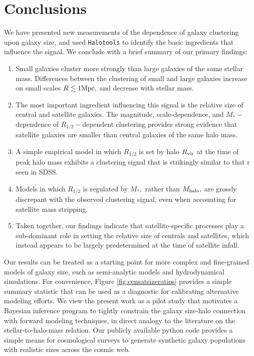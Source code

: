 \documentclass[usenatbib,usegraphicx,letterpaper]{mn2e}
\newcommand{\ben}{\begin{enumerate}}
\newcommand{\een}{\end{enumerate}}
\newcommand{\rhalf}{R_{1/2}}
\newcommand{\mstar}{M_{\ast}}
\newcommand{\mhalo}{M_{\rm halo}}
\newcommand{\rvir}{R_{\rm vir}}
\newcommand{\mpc}{{\rm Mpc}}
\begin{document}
\section{Conclusions}
\label{sec:conclusion}

We have presented new measurements of the dependence of galaxy clustering upon galaxy size, and used {\tt Halotools} to identify the basic ingredients that influence the signal. We conclude with a brief summary of our primary findings:

\ben
\item Small galaxies cluster more strongly than large galaxies of the same stellar mass. Differences between the clustering of small and large galaxies increase on small scales $R\lesssim1\mpc,$ and decrease with stellar mass.
\item The most important ingredient influencing this signal is the relative size of central and satellite galaxies. The magnitude, scale-dependence, and $\mstar-$dependence of $\rhalf-$dependent clustering provides strong evidence that satellite galaxies are smaller than central galaxies of the same halo mass.
\item A simple empirical model in which $\rhalf$ is set by halo $\rvir$ at the time of peak halo mass exhibits a clustering signal that is strikingly similar to that r seen in SDSS.
\item Models in which $\rhalf$ is regulated by $\mstar,$ rather than $\mhalo,$ are grossly discrepant with the observed clustering signal, even when accounting for satellite mass stripping.
\item Taken together, our findings indicate that satellite-specific processes play a sub-dominant role in setting the relative size of centrals and satellites, which instead appears to be largely predetermined at the time of satellite infall.
\een

Our results can be treated as a starting point for more complex and fine-grained models of galaxy size, such as semi-analytic models and hydrodynamical simulations. For convenience, Figure \ref{fig:censatsizeratios} provides a simple summary statistic that can be used as a diagnostic for calibrating alternative modeling efforts. We view the present work as a pilot study that motivates a Bayesian inference program to tightly constrain the galaxy size-halo connection with forward modeling techniques, in direct analogy to the literature on the stellar-to-halo-mass relation. Our publicly available python code provides a simple means for cosmological surveys to generate synthetic galaxy populations with realistic sizes across the cosmic web.
\end{document}

